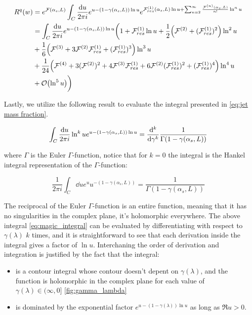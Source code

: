 \documentclass[../main.tex]{subfiles}
\begin{document}
\begin{align}
    \begin{split}
        R^q(w) &= e^{\mathcal{F}(\alpha_s,L)} \int_C \frac{\dd u}{2\pi i} e^{u-(1-\gamma(\alpha_s,L))\ln u} e^{\mathcal{F}^{(1)}_{res}(\alpha_s,L) \ln u +\sum_{n=2}^\infty \frac{\mathcal{F}^{(n)}(\alpha_s,L)}{n!}  \ln^n u}\\
        &= \int_C \frac{\dd u}{2\pi i} e^{u-(1-\gamma(\alpha_s,L))\ln u} \biggl( 1 + \mathcal{F}^{(1)}_{res}\ln u +\frac{1}{2}\qty( \mathcal{F}^{(2)}+(\mathcal{F}^{(1)}_{res})^2)\ln^2 u \\
        &+ \frac{1}{6}\qty(\mathcal{F}^{(3)} + 3 \mathcal{F}^{(2)}\mathcal{F}^{(1)}_{res} + (\mathcal{F}^{(1)}_{res})^3 ) \ln^3 u \\
        &+ \frac{1}{24}\qty(\mathcal{F}^{(4)} + 3(\mathcal{F}^{(2)})^2 + 4 \mathcal{F}^{(3)} \mathcal{F}^{(1)}_{res} + 6 \mathcal{F}^{(2)} (\mathcal{F}^{(1)}_{res})^2 + (\mathcal{F}^{(1)}_{res})^4 )\ln^4 u \\
        &+ \order{\ln^5 u} \biggr)
    \end{split}
\end{align}

Lastly, we utilize the following result to evaluate the integral presented in \cref{eq:jet mass fraction}.

\begin{equation}\label{eq:magic_integral}
    \int_C \frac{\dd u}{2\pi i} \ln^k u e^{u-(1-\gamma(\alpha_s,L))\ln u} = \dv[k]{\gamma} \frac{1}{\Gamma(1-\gamma(\alpha_s,L))}
\end{equation}

where $\Gamma$ is the Euler $\Gamma$-function, notice that for $k=0$ the integral is the Hankel integral representation of the $\Gamma$-function:

\begin{equation}\label{eq:hankel_integral_representation}
    \frac{1}{2\pi i}\int_C \dd u e^{u} u^{-(1-\gamma(\alpha_s,L))} = \frac{1}{\Gamma(1-\gamma(\alpha_s,L))}
\end{equation}

The reciprocal of the Euler $\Gamma$-function is an entire function, meaning that it has no singularities in the complex plane, it's holomorphic everywhere.
The above integral \cref{eq:magic_integral} can be evaluated by differentiating with respect to $\gamma(\lambda)$ $k$ times, and it is straightforward to see that each derivation inside the integral
gives a factor of $\ln u$. Interchaning the order of derivation and integration is justified by the fact that the integral:
\begin{itemize}
    \item  is a contour integral whose contour doesn't depent on $\gamma(\lambda)$, and the function is holomorphic in the complex plane for each value of $\gamma(\lambda) \in (\infty,0]$ \cref{fig:gamma_lambda}
    \item  is dominated by the exponential factor $e^{u - (1-\gamma(\lambda)) \ln u}$ as long as $\Re{u}>0$.  
\end{itemize}
\end{document}
